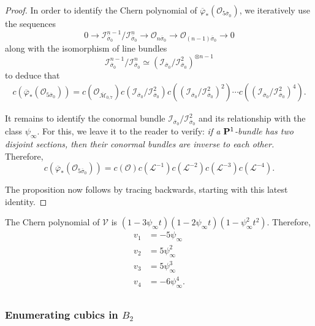 \documentclass[12pt,reqno]{amsart}
\DeclareMathOperator{\M}{\mathcal{M}}
\renewcommand{\to}{{\longrightarrow}}
\numberwithin{equation}{section}
\renewcommand{\O}{\mathcal O}
\newcommand{\V}{\mathcal V}
\renewcommand {\o}[1]{\overline{#1}}
\begin{document}
\begin{proof}
  In order to identify the Chern polynomial of
  $\o{\varphi}_{*}(\O_{5 \o{\sigma}_{0}})$, we iteratively use the
  sequences
  $$0 \to \mathcal{I}_{\o{\sigma}_{0}}^{n-1}/\mathcal{I}_{\o{\sigma}_{0}}^{n} \to \O_{n\o{\sigma}_{0}} \to \O_{(n-1)\o{\sigma}_{0}} \to 0$$ along with the isomorphism of line bundles
  $$\mathcal{I}_{\o{\sigma}_{0}}^{n-1}/\mathcal{I}_{\o{\sigma}_{0}}^{n} \simeq (\mathcal{I}_{\o{\sigma}_{0}}/\mathcal{I}_{\o{\sigma}_{0}}^{2})^{\otimes n-1}$$ to deduce that
  \begin{align}
    \label{eq:rk5}
    c(\o{\varphi}_{*}(\O_{5 \o{\sigma}_{0}})) = c(\O_{\o{\M}_{0,7}})c(\mathcal{I}_{\o{\sigma}_{0}}/\mathcal{I}_{\o{\sigma}_{0}}^{2})c((\mathcal{I}_{\o{\sigma}_{0}}/\mathcal{I}_{\o{\sigma}_{0}}^{2})^{2})\cdots c((\mathcal{I}_{\o{\sigma}_{0}}/\mathcal{I}_{\o{\sigma}_{0}}^{2})^{4}).
  \end{align}

  It remains to identify the conormal bundle
  $\mathcal{I}_{\o{\sigma}_{0}}/\mathcal{I}_{\o{\sigma}_{0}}^{2}$ and
  its relationship with the class $\psi_{\infty}$. For this, we leave
  it to the reader to verify: {\sl if a $\P^{1}$-bundle has two
    disjoint sections, then their conormal bundles are inverse to each
    other.}  Therefore,
  $$c(\o{\varphi}_{*}(\O_{5 \o{\sigma}_{0}})) = c(\O)c(\mathcal{L}^{-1})c(\mathcal{L}^{-2})c(\mathcal{L}^{-3})c(\mathcal{L}^{-4}).$$

  The proposition now follows by tracing backwards, starting with this
  latest identity.
\end{proof}

\begin{corollary}
  \label{cor:chernpolyV2} The Chern polynomial of $\V$ is
  $(1-3\psi_{\infty}t)(1-2
  \psi_{\infty}t)(1-\psi_{\infty}^{2}t^{2})$. Therefore,
  \begin{align}
    \label{eq:chernV2}
    v_1 &= -5\psi_{\infty}\\
    v_2 &= 5 \psi_{\infty}^{2}\\ \nonumber
    v_3 &= 5 \psi_{\infty}^{3}\\ \nonumber
    v_{4} &= -6 \psi_{\infty}^{4}.\\ \nonumber
  \end{align}
\end{corollary}

\subsubsection{Enumerating cubics in $B_{2}$}
\label{sec:enum-cubics-b_2}
\end{document}

